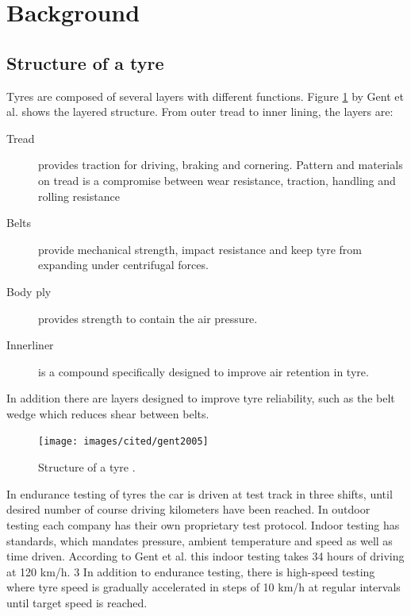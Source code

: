 \section{Background}

\subsection{Structure of a tyre}

Tyres are composed of several layers with different functions. Figure \ref{fig:tyre_structure_diagram} by Gent et
al. \cite{Gent2005} shows the layered structure. From outer tread to inner lining, the layers are: 

\begin{description}
  \item[Tread] provides traction for driving, braking and cornering. Pattern and materials on
tread is a compromise between wear resistance, traction, handling and rolling
resistance
  \item[Belts] provide mechanical strength, impact resistance and keep tyre from expanding
under centrifugal forces.
  \item[Body ply] provides strength to contain the air pressure.
  \item[Innerliner] is a compound specifically designed to improve air retention in tyre.
\end{description}
In addition there are layers designed to improve tyre reliability, such as the belt
wedge which reduces shear between belts.


\begin{figure}[h]
\begin{center}
\texttt{[image: images/cited/gent2005]}
\end{center}
\caption{Structure of a tyre \cite{Gent2005}.}
\label{fig:tyre_structure_diagram}
\end{figure}


In endurance testing of tyres the car is driven at test track in three shifts, until
desired number of course driving kilometers have been reached. In outdoor testing
each company has their own proprietary test protocol. Indoor testing has standards,
which mandates pressure, ambient temperature and speed as well as time driven.
According to Gent et al. \cite{Gent2005} this indoor testing takes 34 hours of driving at 120
km/h.
3
In addition to endurance testing, there is high-speed testing where tyre speed is
gradually accelerated in steps of 10 km/h at regular intervals until target speed is
reached.


